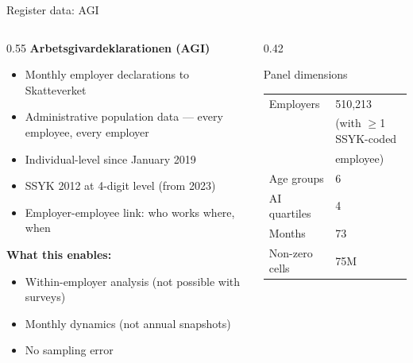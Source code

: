 \documentclass[aspectratio=169,11pt]{beamer}
\begin{document}
\begin{frame}{Register data: AGI}
\begin{columns}[T]
\begin{column}{0.55\textwidth}
\textbf{Arbetsgivardeklarationen (AGI)}
\begin{itemize}
    \item Monthly employer declarations to Skatteverket
    \item Administrative population data --- every employee, every employer
    \item Individual-level since January 2019
    \item SSYK 2012 at 4-digit level (from 2023)
    \item Employer-employee link: who works where, when
\end{itemize}
\vspace{2mm}
\textbf{What this enables:}
\begin{itemize}
    \item Within-employer analysis (not possible with surveys)
    \item Monthly dynamics (not annual snapshots)
    \item No sampling error
\end{itemize}
\end{column}
\begin{column}{0.42\textwidth}
\begin{block}{Panel dimensions}
\footnotesize
\begin{tabular}{ll}
Employers & 510,213 \\
& {\tiny (with $\geq$1 SSYK-coded} \\
& {\tiny employee)} \\
Age groups & 6 \\
AI quartiles & 4 \\
Months & 73 \\
Non-zero cells & 75M \\
\end{tabular}
\end{block}
\end{column}
\end{columns}
\end{frame}
\end{document}
